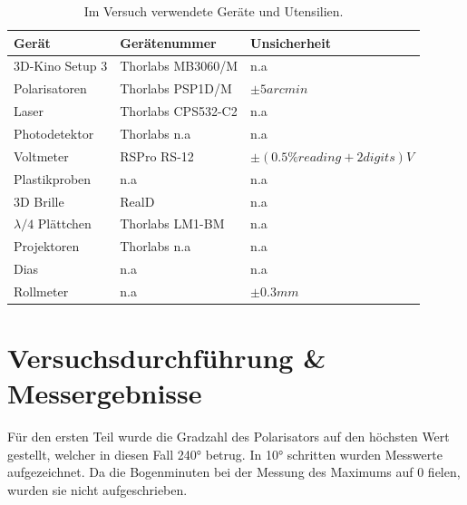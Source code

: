\documentclass[12pt,a4paper,twoside]{article}
\begin{document}
    \begin{table}[H]
        \centering
        \caption{Im Versuch verwendete Geräte und Utensilien.}
        \label{tab:geraete}
        \begin{tabular}{| l | l | l |}
            \hline
            Gerät   & Gerätenummer  & Unsicherheit \\
            \hline
            3D-Kino Setup 3 & Thorlabs MB3060/M & {n.a} \\
            Polarisatoren & Thorlabs PSP1D/M & $\pm 5 arcmin$\\
            Laser & Thorlabs CPS532-C2 & {n.a}\\
            Photodetektor & Thorlabs {n.a} & {n.a}\\
            Voltmeter & RSPro RS-12 & $\pm(0.5\% reading + 2 digits)V$ \cite{voltmeter} \\
            Plastikproben & {n.a} & {n.a} \\
            3D Brille & RealD & {n.a} \\
            $\lambda/4$ Plättchen & Thorlabs LM1-BM & {n.a} \\
            Projektoren & Thorlabs {n.a} & {n.a} \\
            Dias & {n.a} & {n.a} \\
            Rollmeter & {n.a} & $\pm 0.3mm$ \\
            \hline
        \end{tabular}
    \end{table}


\section{Versuchsdurchführung \& Messergebnisse} %
Für den ersten Teil wurde die Gradzahl des Polarisators auf den höchsten Wert gestellt, welcher in diesen Fall 240° betrug.
In 10° schritten wurden Messwerte aufgezeichnet. Da die Bogenminuten bei der Messung des Maximums auf 0 fielen, wurden sie nicht aufgeschrieben. 
\end{document}
